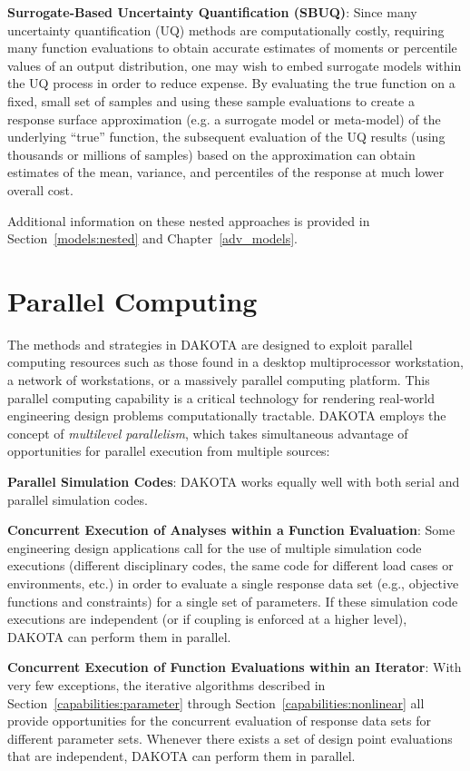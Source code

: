 \textbf{Surrogate-Based Uncertainty Quantification (SBUQ)}: 
Since many uncertainty quantification (UQ) methods are computationally
costly, requiring many function evaluations to obtain accurate
estimates of moments or percentile values of an output distribution,
one may wish to embed surrogate models within the UQ process in order
to reduce expense.  By evaluating the true function on a fixed, small
set of samples and using these sample evaluations to create a response
surface approximation (e.g. a surrogate model or meta-model) of the
underlying ``true'' function, the subsequent evaluation of the UQ
results (using thousands or millions of samples) based on the
approximation can obtain estimates of the mean, variance, and
percentiles of the response at much lower overall cost.

Additional information on these nested approaches is provided in
Section~\ref{models:nested} and Chapter~\ref{adv_models}.

\section{Parallel Computing}\label{capabilities:parallel}

The methods and strategies in DAKOTA are designed to exploit parallel
computing resources such as those found in a desktop multiprocessor
workstation, a network of workstations, or a massively parallel
computing platform. This parallel computing capability is a critical
technology for rendering real-world engineering design problems
computationally tractable. DAKOTA employs the concept of
\emph{multilevel parallelism}, which takes simultaneous advantage of
opportunities for parallel execution from multiple sources:

\textbf{Parallel Simulation Codes}: DAKOTA works equally well with both
serial and parallel simulation codes.

\textbf{Concurrent Execution of Analyses within a Function Evaluation}:
Some engineering design applications call for the use of multiple
simulation code executions (different disciplinary codes, the same
code for different load cases or environments, etc.) in order to
evaluate a single response data set (e.g., objective functions and
constraints) for a single set of parameters. If these simulation code
executions are independent (or if coupling is enforced at a higher
level), DAKOTA can perform them in parallel.

\textbf{Concurrent Execution of Function Evaluations within an Iterator}:
With very few exceptions, the iterative algorithms described in
Section~\ref{capabilities:parameter} through
Section~\ref{capabilities:nonlinear} all provide opportunities for the
concurrent evaluation of response data sets for different parameter
sets. Whenever there exists a set of design point evaluations that are
independent, DAKOTA can perform them in parallel.

